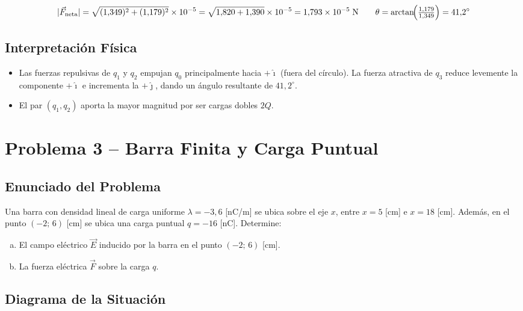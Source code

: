 \documentclass[12pt,letterpaper]{article}
\begin{document}
\begin{equation*}
    |\vec{F}_{\rm neta}|
    = \sqrt{(1{,}349)^2+(1{,}179)^2}\times10^{-5}
    = \sqrt{1{,}820+1{,}390}\times10^{-5}
    = 1{,}793\times10^{-5}\;\text{N}
    \qquad
    \theta = \arctan\!\Bigl(\tfrac{1{,}179}{1{,}349}\Bigr) = 41{,}2^\circ
\end{equation*}

\subsection*{Interpretaci\'on F\'isica}

\begin{itemize}
    \item Las fuerzas repulsivas de $q_1$ y $q_2$ empujan $q_0$ principalmente hacia $+\hat{\imath}$
          (fuera del c\'irculo). La fuerza atractiva de $q_3$ reduce levemente la componente $+\hat{\imath}$
          e incrementa la $+\hat{\jmath}$, dando un \'angulo resultante de $41{,}2^\circ$.
    \item El par $(q_1, q_2)$ aporta la mayor magnitud por ser cargas dobles $2Q$.
\end{itemize}

\newpage
\section*{\textcolor{ubbblue}{Problema 3 \;--\; Barra Finita y Carga Puntual}}

\subsection*{Enunciado del Problema}

Una barra con densidad lineal de carga uniforme $\lambda = -3{,}6$ [nC/m] se ubica sobre el eje $x$,
entre $x=5$ [cm] e $x=18$ [cm]. Adem\'as, en el punto $(-2;\,6)$ [cm] se ubica una carga puntual
$q = -16$ [nC]. Determine:
\begin{enumerate}[(a)]
    \item El campo el\'ectrico $\vec{E}$ inducido por la barra en el punto $(-2;\,6)$ [cm].
    \item La fuerza el\'ectrica $\vec{F}$ sobre la carga $q$.
\end{enumerate}

\subsection*{Diagrama de la Situaci\'on}
\end{document}

